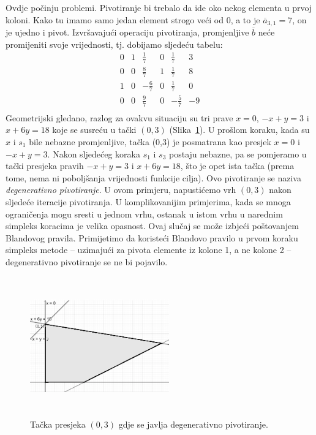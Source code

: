 \documentclass[b5paper, utf8, 11pt, colorlinks]{book}
\theoremstyle{definition}
\begin{document}
Ovdje počinju problemi. Pivotiranje bi trebalo da ide oko nekog elementa u prvoj koloni. Kako tu imamo samo jedan element strogo veći od 0, a to je $\overline{a}_{3,1}=7$, on je ujedno i pivot. Izvršavajući operaciju pivotiranja, promjenljive $\overline{b}$ neće promijeniti svoje vrijednosti, tj. dobijamo sljedeću tabelu:
$$\begin{array}{ccccc|c}
	0 & 1 & \frac{1}{7}  & 0 & \frac{1}{7} & 3 \\
	0 & 0 & \frac{8}{7}  & 1 & \frac{1}{7} & 8 \\
	1 & 0 & -\frac{6}{7} & 0 & \frac{1}{7} & 0 \\ \hline
	0 & 0 & \frac{9}{7}  & 0 & -\frac{5}{7} & -9 \\
\end{array}$$
Geometrijski gledano, razlog za ovakvu situaciju su tri prave $x=0$, $-x+y=3$ i $x+6y=18$ koje se susreću u tački $(0,3)$ (Slika~\ref{fig:deg-sol}). U prošlom koraku, kada su $x$ i $s_1$ bile nebazne promjenljive, tačka (0,3) je posmatrana kao presjek $x=0$ i $-x +y =3$. Nakon sljedećeg koraka $s_1$ i $s_3$ postaju nebazne, pa se pomjeramo u tački presjeka pravih 
$-x+y=3$ i $x+6y=18$, što je opet ista tačka (prema tome, nema ni poboljšanja vrijednosti funkcije cilja). 
Ovo pivotiranje se naziva \emph{degenerativno pivotiranje}. U ovom primjeru, napustićemo vrh $(0,3)$ nakon sljedeće iteracije  pivotiranja. U komplikovanijim primjerima, kada se mnoga ograničenja mogu sresti u jednom vrhu, ostanak u istom vrhu u narednim simpleks koracima je velika opasnost. Ovaj slučaj se može izbjeći poštovanjem 
Blandovog pravila. Primijetimo da koristeći Blandovo pravilo u prvom koraku simpleks metode -- uzimajući za pivota elemente iz kolone 1, a ne kolone 2 --  degenerativno pivotiranje se ne bi pojavilo.  


\begin{figure}[!ht]
	\centering
	\includegraphics[width=170pt,height=170pt]{deg-sol.eps}
	\caption{Tačka presjeka $(0,3)$ gdje se javlja degenerativno pivotiranje.}
	\label{fig:deg-sol}
\end{figure}
\end{document}
